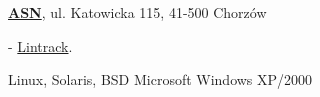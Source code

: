 \documentclass[10pt]{article}
\renewcommand{\section}[2]%
        {\pagebreak[2]\vspace{1.4\baselineskip}%
         \phantomsection\addcontentsline{toc}{section}{#1}%
         \hspace{0in}%
         \marginpar{
         \raggedright \scshape #1}#2}
\renewcommand{\subsection}[2]%
        {\pagebreak[2]\vspace{0.3\baselineskip}%
         \phantomsection\addcontentsline{toc}{subsection}{#1}%
         \hspace{0in}%
         \marginpar{\scriptsize
         \raggedright \scshape #1}#2}
\newenvironment{outerlist}[1][\enskip\textbullet]%
        {\begin{itemize}[#1]}{\end{itemize}%
         \vspace{-.6\baselineskip}}
\newenvironment{innerlist}[1][\enskip\textbullet]%
        {\begin{compactitem}[#1]}{\end{compactitem}}
\newcommand{\blankline}{\quad\pagebreak[2]}
\begin{document}
\href{http://asn.pl/}{\textbf{ASN}}, 
ul. Katowicka 115, 41-500 Chorzów
\begin{outerlist}

\item[] \textit{
}%
        \hfill \textbf{
}
\begin{innerlist}
\item
\item 
\item
- \href{http://lintrack.org}{Lintrack}.
\end{innerlist}

\end{outerlist}

\pagebreak[4]

%

\blankline

  Linux, Solaris, BSD
Microsoft Windows XP/2000
\end{document}

